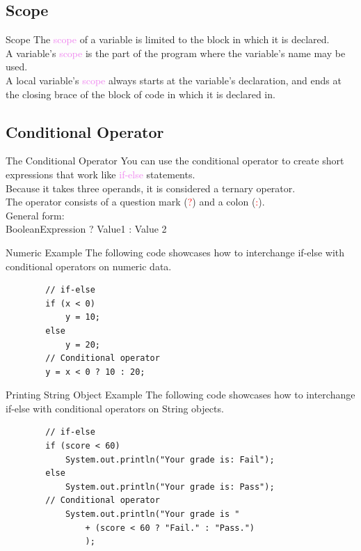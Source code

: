 \documentclass[11pt]{beamer}
\newcommand{\red}[1]{\textcolor{red}{#1}}
\newcommand{\violet}[1]{\textcolor{violet}{#1}}
\begin{document}
\subsection{Scope}
    
\begin{frame}{Scope}
    The \violet{scope} of a variable is limited to the block in which it is declared. \\
    \vspace{1em}
    A variable's \violet{scope} is the part of the program where the variable's name may be used. \\
    \vspace{1em}
    A local variable's \violet{scope} always starts at the variable's declaration, and ends at the closing brace of the block of code in which it is declared in.
\end{frame}

\subsection{Conditional Operator}
\begin{frame}{The Conditional Operator}
    You can use the conditional operator to create short expressions that work like \violet{if-else} statements. \\
    \vspace{1em}
    Because it takes three operands, it is considered a ternary operator. \\
    \vspace{1em}
    The operator consists of a question mark (\red{?}) and a colon (\red{:}). \\
    \vspace{1em}
    General form: \\
    BooleanExpression ? Value1 : Value 2
\end{frame}

\begin{frame}[fragile]{Numeric Example}
    The following code showcases how to interchange if-else with conditional operators on numeric data.
    \begin{lstlisting}
        // if-else
        if (x < 0)
            y = 10;
        else
            y = 20;
        // Conditional operator
        y = x < 0 ? 10 : 20;
    \end{lstlisting}
\end{frame}

\begin{frame}[fragile]{Printing String Object Example}
    The following code showcases how to interchange if-else with conditional operators on String objects.
    \begin{lstlisting}
        // if-else
        if (score < 60)
            System.out.println("Your grade is: Fail");
        else
            System.out.println("Your grade is: Pass");
        // Conditional operator
            System.out.println("Your grade is " 
                + (score < 60 ? "Fail." : "Pass.")
                );
    \end{lstlisting}
\end{frame}
\end{document}

